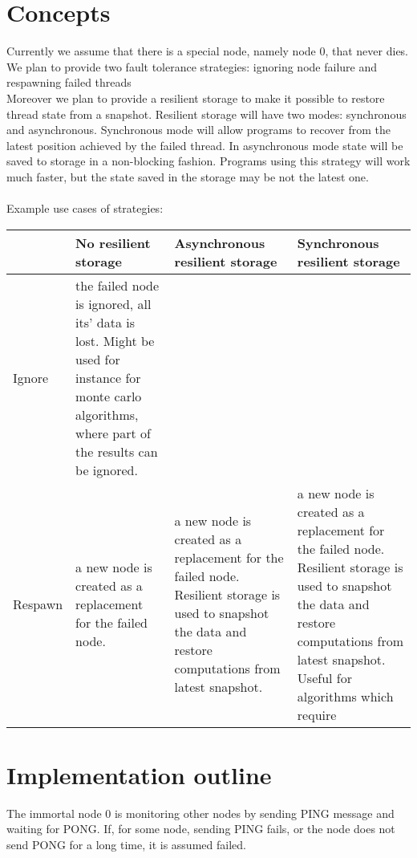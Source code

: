 \documentclass[12pt]{article}
\begin{document}
\section{Concepts}
Currently we assume that there is a special node, namely node 0, that never dies.
We plan to provide two fault tolerance strategies: ignoring node failure and respawning failed threads
  \\
Moreover we plan to provide a resilient storage to make it possible to restore thread state from a snapshot.
Resilient storage will have two modes: synchronous and asynchronous.
Synchronous mode will allow programs to recover from the latest position achieved by the failed thread.
In asynchronous mode state will be saved to storage in a non-blocking fashion.
Programs using this strategy will work much faster, but the state saved in the storage may be not the latest one.
\\                                  \\
Example use cases of strategies: \\
\begin{tabular}{|l | p{3.5cm} | p{3.5cm} | p{3.5cm}|}
  \hline
  & No resilient storage & Asynchronous resilient storage & Synchronous resilient storage\\
  \hline
  Ignore &  the failed node is ignored, all its' data is lost. Might be used for instance
                    for monte carlo algorithms, where part of the results can be ignored.
                    &  & \\
  \hline
  Respawn &  a new node is created as a replacement for the failed node. &  a new node is created as a replacement for the failed node.
                Resilient storage is used to snapshot the data and restore computations from latest snapshot.
                     & a new node is created as a replacement for the failed node.
                       Resilient storage is used to snapshot the data and restore computations from latest snapshot.
                       Useful for algorithms which require \\
  \hline
\end{tabular}



\section{Implementation outline}

The immortal node 0 is monitoring other nodes by sending PING message and waiting for PONG.
If, for some node, sending PING fails, or the node does not send PONG for a long time,
it is assumed failed.
\end{document}
